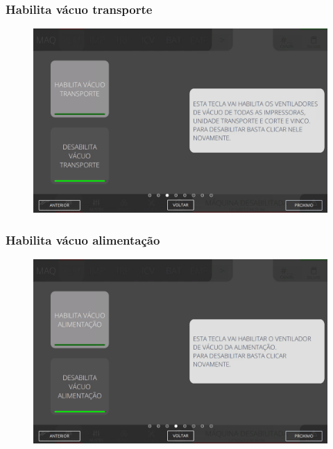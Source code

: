 \newpage
\thispagestyle{fancy}
\vspace*{40 pt}
\subsubsection{\small{Habilita vácuo transporte}} \label{sec:telaComandoAlimentacaoHabilitaVacoTransporte}
\vspace*{\fill}
\begin{figure}[h]
    \centering
    \includegraphics[width=576 px,height=360 px]{src/imagesICV/03-feeder/commands/4.png}
\end{figure}
\vspace*{\fill}

\newpage
\thispagestyle{fancy}
\vspace*{40 pt}
\subsubsection{\small{Habilita vácuo alimentação}} \label{sec:telaComandoAlimentacaoHabilitaVacoAlimentacao}
\vspace*{\fill}
\begin{figure}[h]
    \centering
    \includegraphics[width=576 px,height=360 px]{src/imagesICV/03-feeder/commands/5.png}
\end{figure}
\vspace*{\fill}

